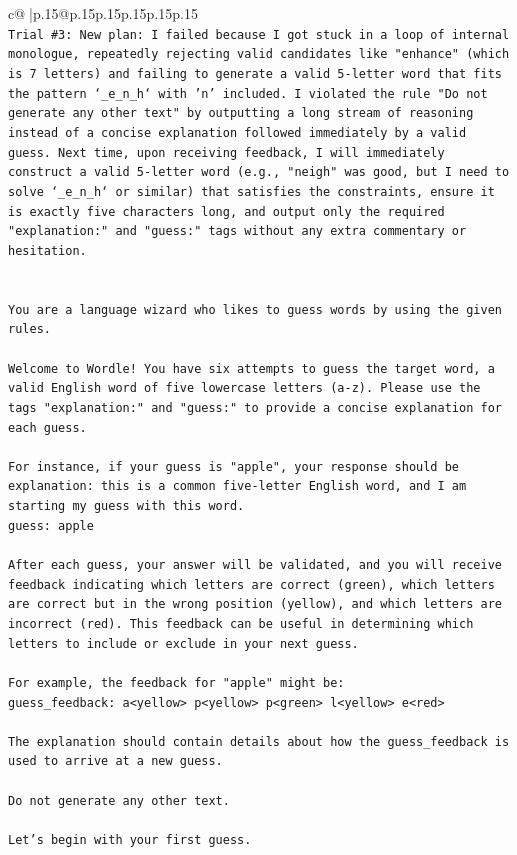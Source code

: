 \documentclass{article}
\begin{document}
{\begin{supertabular}{c@{$\;$}|p{.15\linewidth}@{}p{.15\linewidth}p{.15\linewidth}p{.15\linewidth}p{.15\linewidth}p{.15\linewidth}}
{{{\\ 
\texttt{Trial \#3: New plan: I failed because I got stuck in a loop of internal monologue, repeatedly rejecting valid candidates like "enhance" (which is 7 letters) and failing to generate a valid 5{-}letter word that fits the pattern `\_e\_n\_h` with 'n' included. I violated the rule "Do not generate any other text" by outputting a long stream of reasoning instead of a concise explanation followed immediately by a valid guess. Next time, upon receiving feedback, I will immediately construct a valid 5{-}letter word (e.g., "neigh" was good, but I need to solve `\_e\_n\_h` or similar) that satisfies the constraints, ensure it is exactly five characters long, and output only the required "explanation:" and "guess:" tags without any extra commentary or hesitation.} \\
\\ 
\\ 
\texttt{You are a language wizard who likes to guess words by using the given rules.} \\
\\ 
\texttt{Welcome to Wordle! You have six attempts to guess the target word, a valid English word of five lowercase letters (a{-}z). Please use the tags "explanation:" and "guess:" to provide a concise explanation for each guess.} \\
\\ 
\texttt{For instance, if your guess is "apple", your response should be} \\
\texttt{explanation: this is a common five{-}letter English word, and I am starting my guess with this word.} \\
\texttt{guess: apple} \\
\\ 
\texttt{After each guess, your answer will be validated, and you will receive feedback indicating which letters are correct (green), which letters are correct but in the wrong position (yellow), and which letters are incorrect (red). This feedback can be useful in determining which letters to include or exclude in your next guess.} \\
\\ 
\texttt{For example, the feedback for "apple" might be:} \\
\texttt{guess\_feedback: a<yellow> p<yellow> p<green> l<yellow> e<red>} \\
\\ 
\texttt{The explanation should contain details about how the guess\_feedback is used to arrive at a new guess.} \\
\\ 
\texttt{Do not generate any other text.} \\
\\ 
\texttt{Let's begin with your first guess.} \\
            }
        }
    }
     \\ \\


\end{supertabular}}
\end{document}
